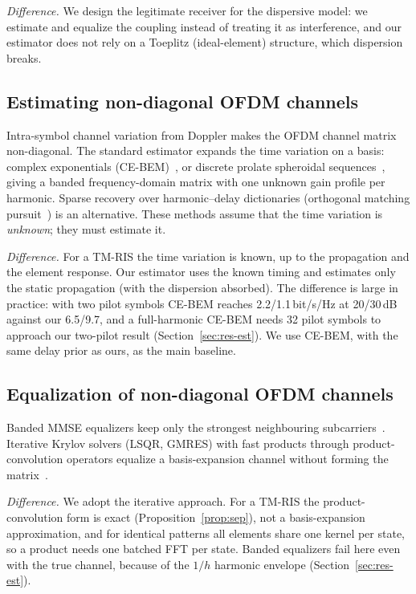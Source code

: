 \emph{Difference.} We design the legitimate receiver for the dispersive model: we
estimate and equalize the coupling instead of treating it as interference, and our
estimator does not rely on a Toeplitz (ideal-element) structure, which dispersion breaks.

\subsection{Estimating non-diagonal OFDM channels}
Intra-symbol channel variation from Doppler makes the OFDM channel matrix
non-diagonal. The standard estimator expands the time variation on a basis: complex
exponentials (CE-BEM)~\cite{tang2007}, or discrete prolate spheroidal
sequences~\cite{zemen2005}, giving a banded frequency-domain matrix with one unknown
gain profile per harmonic. Sparse recovery over harmonic--delay dictionaries
(orthogonal matching pursuit~\cite{tropp2007}) is an alternative. These methods assume
that the time variation is \emph{unknown}; they must estimate it.

\emph{Difference.} For a TM-RIS the time variation is known, up to the propagation
and the element response. Our estimator uses the known timing and estimates only the
static propagation (with the dispersion absorbed). The difference is large in
practice: with two pilot symbols CE-BEM reaches 2.2/1.1\,bit/s/Hz at 20/30\,dB against
our 6.5/9.7, and a full-harmonic CE-BEM needs 32 pilot symbols to approach our
two-pilot result (Section~\ref{sec:res-est}). We use CE-BEM, with the same delay prior
as ours, as the main baseline.

\subsection{Equalization of non-diagonal OFDM channels}
Banded MMSE equalizers keep only the strongest neighbouring subcarriers~\cite{schniter2004,rugini2005}.
Iterative Krylov solvers (LSQR, GMRES) with fast products through product-convolution
operators equalize a basis-expansion channel without forming the matrix~\cite{hrycak2010}.

\emph{Difference.} We adopt the iterative approach. For a TM-RIS the product-convolution
form is exact (Proposition~\ref{prop:sep}), not a basis-expansion approximation, and for
identical patterns all elements share one kernel per state, so a product needs one
batched FFT per state. Banded equalizers fail here even with the true channel, because
of the $1/h$ harmonic envelope (Section~\ref{sec:res-est}).

